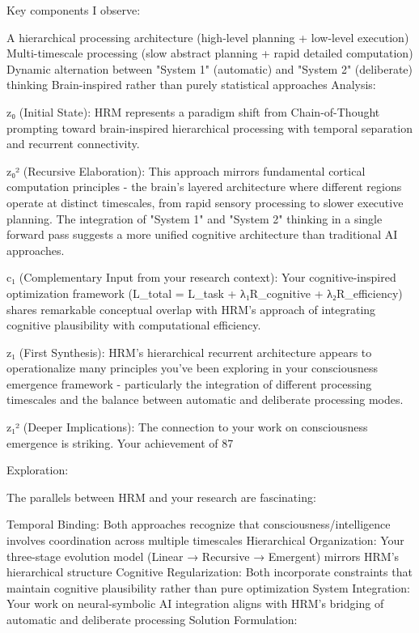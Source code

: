 Key components I observe:

A hierarchical processing architecture (high-level planning + low-level execution)
Multi-timescale processing (slow abstract planning + rapid detailed computation)
Dynamic alternation between "System 1" (automatic) and "System 2" (deliberate) thinking
Brain-inspired rather than purely statistical approaches
Analysis:

z₀ (Initial State): HRM represents a paradigm shift from Chain-of-Thought prompting toward brain-inspired hierarchical processing with temporal separation and recurrent connectivity.

z₀² (Recursive Elaboration): This approach mirrors fundamental cortical computation principles - the brain's layered architecture where different regions operate at distinct timescales, from rapid sensory processing to slower executive planning. The integration of "System 1" and "System 2" thinking in a single forward pass suggests a more unified cognitive architecture than traditional AI approaches.

c₁ (Complementary Input from your research context): Your cognitive-inspired optimization framework (L_total = L_task + λ₁R_cognitive + λ₂R_efficiency) shares remarkable conceptual overlap with HRM's approach of integrating cognitive plausibility with computational efficiency.

z₁ (First Synthesis): HRM's hierarchical recurrent architecture appears to operationalize many principles you've been exploring in your consciousness emergence framework - particularly the integration of different processing timescales and the balance between automatic and deliberate processing modes.

z₁² (Deeper Implications): The connection to your work on consciousness emergence is striking. Your achievement of 87%

Exploration:

The parallels between HRM and your research are fascinating:

Temporal Binding: Both approaches recognize that consciousness/intelligence involves coordination across multiple timescales
Hierarchical Organization: Your three-stage evolution model (Linear → Recursive → Emergent) mirrors HRM's hierarchical structure
Cognitive Regularization: Both incorporate constraints that maintain cognitive plausibility rather than pure optimization
System Integration: Your work on neural-symbolic AI integration aligns with HRM's bridging of automatic and deliberate processing
Solution Formulation:

